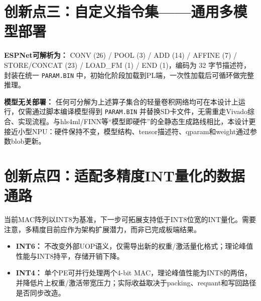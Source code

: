 \documentclass[11pt,a4paper]{article}
\begin{document}

\section*{创新点三：自定义指令集——通用多模型部署}

\textbf{ESPNet可解析为：} CONV (26) / POOL (3) / ADD (14) / AFFINE (7) / STORE/CONCAT (23) / LOAD\_FM (1) / END (1)，编码为 32 字节描述符，封装在统一 \texttt{PARAM.BIN} 中，初始化阶段加载到PL端，一次性加载后可循环做完整推理。

\textbf{模型无关部署：} 任何可分解为上述算子集合的轻量卷积网络均可在本设计上运行，仅需通过脚本编译模型得到 \texttt{PARAM.BIN} 并替换SD卡文件，无需重走Vivado综合、实现流程。与hls4ml/FINN等“模型即硬件”的全静态生成路线相比，本设计更接近小型NPU：硬件保持不变，模型结构、tensor描述符、qparam和weight通过参数blob更新。


\section*{创新点四：适配多精度INT量化的数据通路}

当前MAC阵列以INT8为基准，下一步可拓展支持低于INT8位宽的INT量化。需要注意，多精度目前应作为架构扩展潜力，而非已完成板端结果。
\begin{itemize}
\item \textbf{INT6：} 不改变外部UOP语义，仅需导出新的权重/激活量化格式；理论峰值性能与INT8持平，存储开销下降。
\item \textbf{INT4：} 单个PE可并行处理两个4-bit MAC，理论峰值性能为INT8的两倍，并降低片上权重/激活带宽压力；实际收益取决于packing、requant和写回路径是否同步改造。
\end{itemize}

\begin{table}[h]
\centering
\caption{多精度支持对比}
\small
{}
\end{table}
\end{document}
